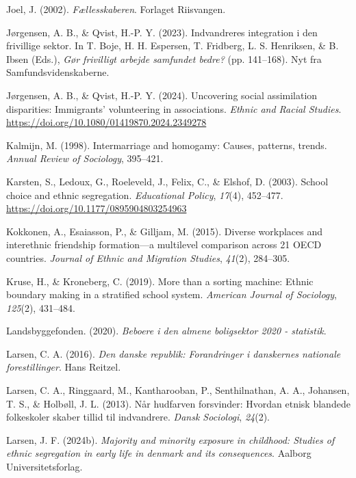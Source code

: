\documentclass[
]{book}
\newlength{\cslhangindent}
\newenvironment{CSLReferences}[2] %
 {\begin{list}{}{%
  \setlength{\itemindent}{0pt}
  \setlength{\leftmargin}{0pt}
  \setlength{\parsep}{0pt}
  \ifodd #1
   \setlength{\leftmargin}{\cslhangindent}
   \setlength{\itemindent}{-1\cslhangindent}
  \fi
  \setlength{\itemsep}{#2\baselineskip}}}
 {\end{list}}
\begin{document}
\begin{CSLReferences}{1}{0}
Joel, J. (2002). \emph{Fællesskaberen}. Forlaget Riisvangen.

Jørgensen, A. B., \& Qvist, H.-P. Y. (2023). Indvandreres integration i den frivillige sektor. In T. Boje, H. H. Espersen, T. Fridberg, L. S. Henriksen, \& B. Ibsen (Eds.), \emph{Gør frivilligt arbejde samfundet bedre?} (pp. 141--168). Nyt fra Samfundsvidenskaberne.

Jørgensen, A. B., \& Qvist, H.-P. Y. (2024). Uncovering social assimilation disparities: Immigrants' volunteering in associations. \emph{Ethnic and Racial Studies}. \url{https://doi.org/10.1080/01419870.2024.2349278}

Kalmijn, M. (1998). Intermarriage and homogamy: Causes, patterns, trends. \emph{Annual Review of Sociology}, 395--421.

Karsten, S., Ledoux, G., Roeleveld, J., Felix, C., \& Elshof, D. (2003). School choice and ethnic segregation. \emph{Educational Policy}, \emph{17}(4), 452--477. \url{https://doi.org/10.1177/0895904803254963}

Kokkonen, A., Esaiasson, P., \& Gilljam, M. (2015). Diverse workplaces and interethnic friendship formation---a multilevel comparison across 21 OECD countries. \emph{Journal of Ethnic and Migration Studies}, \emph{41}(2), 284--305.

Kruse, H., \& Kroneberg, C. (2019). More than a sorting machine: Ethnic boundary making in a stratified school system. \emph{American Journal of Sociology}, \emph{125}(2), 431--484.

Landsbyggefonden. (2020). \emph{Beboere i den almene boligsektor 2020 - statistik}.

Larsen, C. A. (2016). \emph{Den danske republik: Forandringer i danskernes nationale forestillinger}. Hans Reitzel.

Larsen, C. A., Ringgaard, M., Kantharooban, P., Senthilnathan, A. A., Johansen, T. S., \& Holbøll, J. L. (2013). Når hudfarven forsvinder: Hvordan etnisk blandede folkeskoler skaber tillid til indvandrere. \emph{Dansk Sociologi}, \emph{24}(2).

Larsen, J. F. (2024b). \emph{Majority and minority exposure in childhood: Studies of ethnic segregation in early life in denmark and its consequences}. Aalborg Universitetsforlag.


\end{CSLReferences}
\end{document}
